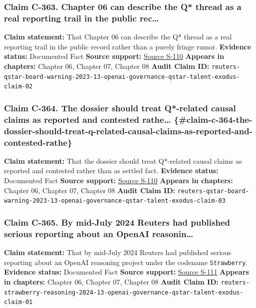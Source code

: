 \documentclass[
  american,
  11pt,
  letterpaper,
]{article}
\begin{document}
\subsubsection{Claim C-363. Chapter 06 can describe the Q* thread as a
real reporting trail in the public
rec\ldots{}}\label{claim-c-363-chapter-06-can-describe-the-q-thread-as-a-real-reporting-trail-in-the-public-rec}

\textbf{Claim statement:} That Chapter 06 can describe the Q* thread as
a real reporting trail in the public record rather than a purely fringe
rumor. \textbf{Evidence status:} Documented Fact \textbf{Source
support:}
\hyperref[source-s-110-openai-researchers-warned-board-of-ai-breakthrough-ahead-of-ceo-ouster-sources-say]{Source
S-110} \textbf{Appears in chapters:} Chapter 06, Chapter 07, Chapter 08
\textbf{Audit Claim ID:}
\texttt{reuters-qstar-board-warning-2023-13-openai-governance-qstar-talent-exodus-claim-02}

\subsubsection{Claim C-364. The dossier should treat Q*-related causal
claims as reported and contested rathe\ldots{}
\{\#claim-c-364-the-dossier-should-treat-q-related-causal-claims-as-reported-and-contested-rathe\}}\label{claim-c-364.-the-dossier-should-treat-q-related-causal-claims-as-reported-and-contested-rathe-claim-c-364-the-dossier-should-treat-q-related-causal-claims-as-reported-and-contested-rathe}

\textbf{Claim statement:} That the dossier should treat Q*-related
causal claims as reported and contested rather than as settled fact.
\textbf{Evidence status:} Documented Fact \textbf{Source support:}
\hyperref[source-s-110-openai-researchers-warned-board-of-ai-breakthrough-ahead-of-ceo-ouster-sources-say]{Source
S-110} \textbf{Appears in chapters:} Chapter 06, Chapter 07, Chapter 08
\textbf{Audit Claim ID:}
\texttt{reuters-qstar-board-warning-2023-13-openai-governance-qstar-talent-exodus-claim-03}

\subsubsection{Claim C-365. By mid-July 2024 Reuters had published
serious reporting about an OpenAI
reasonin\ldots{}}\label{claim-c-365-by-mid-july-2024-reuters-had-published-serious-reporting-about-an-openai-reasonin}

\textbf{Claim statement:} That by mid-July 2024 Reuters had published
serious reporting about an OpenAI reasoning project under the codename
\texttt{Strawberry}. \textbf{Evidence status:} Documented Fact
\textbf{Source support:}
\hyperref[source-s-111-exclusive-openai-working-on-new-reasoning-technology-under-code-name-strawberry]{Source
S-111} \textbf{Appears in chapters:} Chapter 06, Chapter 07, Chapter 08
\textbf{Audit Claim ID:}
\texttt{reuters-strawberry-reasoning-2024-13-openai-governance-qstar-talent-exodus-claim-01}
\end{document}
